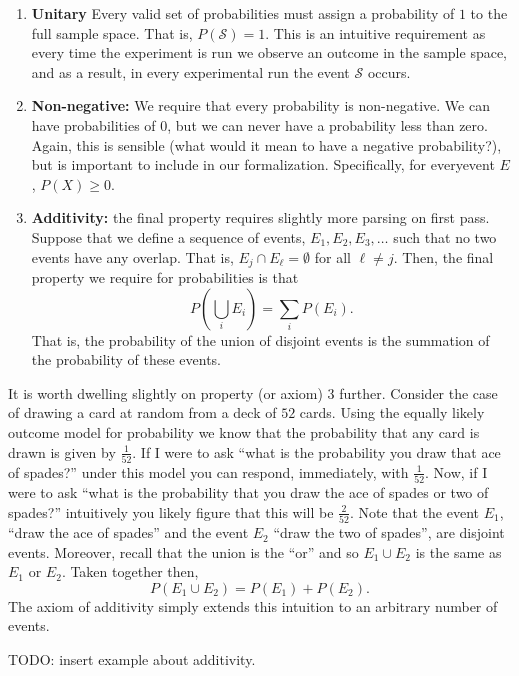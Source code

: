 \documentclass[
  letterpaper,
  DIV=11,
  numbers=noendperiod]{scrreprt}
\providecommand{\tightlist}{%
  \setlength{\itemsep}{0pt}\setlength{\parskip}{0pt}}\usepackage{longtable,booktabs,array}
\begin{document}
\begin{enumerate}
\def\labelenumi{\arabic{enumi}.}
\tightlist
\item
  \textbf{Unitary} Every valid set of probabilities must assign a
  probability of \(1\) to the full sample space. That is,
  \(P(\mathcal{S}) = 1\). This is an intuitive requirement as every time
  the experiment is run we observe an outcome in the sample space, and
  as a result, in every experimental run the event \(\mathcal{S}\)
  occurs.
\item
  \textbf{Non-negative:} We require that every probability is
  non-negative. We can have probabilities of \(0\), but we can never
  have a probability less than zero. Again, this is sensible (what would
  it mean to have a negative probability?), but is important to include
  in our formalization. Specifically, for everyevent \(E\),
  \(P(X) \geq 0\).
\item
  \textbf{Additivity:} the final property requires slightly more parsing
  on first pass. Suppose that we define a sequence of events,
  \(E_1, E_2, E_3, \dots\) such that no two events have any overlap.
  That is, \(E_j \cap E_\ell = \emptyset\) for all \(\ell\neq j\). Then,
  the final property we require for probabilities is that
  \[P\left(\bigcup_i E_i\right) = \sum_i P(E_i).\] That is, the
  probability of the union of disjoint events is the summation of the
  probability of these events.
\end{enumerate}

It is worth dwelling slightly on property (or axiom) 3 further. Consider
the case of drawing a card at random from a deck of \(52\) cards. Using
the equally likely outcome model for probability we know that the
probability that any card is drawn is given by \(\frac{1}{52}\). If I
were to ask ``what is the probability you draw that ace of spades?''
under this model you can respond, immediately, with \(\frac{1}{52}\).
Now, if I were to ask ``what is the probability that you draw the ace of
spades or two of spades?'' intuitively you likely figure that this will
be \(\frac{2}{52}\). Note that the event \(E_1\), ``draw the ace of
spades'' and the event \(E_2\) ``draw the two of spades'', are disjoint
events. Moreover, recall that the union is the ``or'' and so
\(E_1\cup E_2\) is the same as \(E_1\) or \(E_2\). Taken together then,
\[P(E_1\cup E_2) = P(E_1) + P(E_2).\] The axiom of additivity simply
extends this intuition to an arbitrary number of events.

TODO: insert example about additivity.
\end{document}

